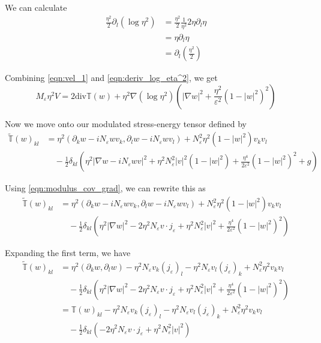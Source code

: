 \documentclass[a4paper]{article}
\renewcommand{\div}{\mathrm{div}}
\begin{document}
We can calculate
\begin{align}
  \frac{\eta^2}{2} \partial_l ( \log \eta^2 ) &= \frac{\eta^2}{2} \frac{1}{\eta^2} 2 \eta \partial_l \eta \nonumber \\
  &= \eta \partial_l \eta \nonumber \\
  &= \partial_l \left( \frac{\eta^2}{2} \right)
  \label{eqn:deriv_log_eta^2}
\end{align}

Combining \eqref{eqn:vel_1} and \eqref{eqn:deriv_log_eta^2}, we get
\begin{equation}
  M_\varepsilon \eta^2 V = 2 \div \mathbb{T}(w) + \eta^2 \nabla ( \log \eta^2 ) \left( | \nabla w |^2 + \frac{\eta^2}{\varepsilon^2} (1-|w|^2)^2
  \right)
  \label{eqn:div_stress_energy}
\end{equation}

Now we move onto our modulated stress-energy tensor defined by
\begin{align}
  \tilde{\mathbb{T}}(w)_{kl} &= \eta^2 ( \partial_k w - i N_\varepsilon w v_k, \partial_l w - i N_\varepsilon w v_l) + N_\varepsilon^2 \eta^2 (1-|w|^2)
  v_k v_l \nonumber \\
  &\quad - \frac{1}{2} \delta_{kl} \left( \eta^2 | \nabla w - i N_\varepsilon w v |^2 + \eta^2 N_\varepsilon^2 |v|^2 (1 - |w|^2) + \frac{\eta^4}{2 \varepsilon^2} (1-|w|^2)^2 + g \right)
  \label{eqn:def_mod_stress_energy}
\end{align}

Using \eqref{eqn:modulus_cov_grad}, we can rewrite this as
\begin{align}
  \tilde{\mathbb{T}}(w)_{kl} &= \eta^2 ( \partial_k w - i N_\varepsilon w v_k, \partial_l w - i N_\varepsilon w v_l) + N_\varepsilon^2 \eta^2 (1-|w|^2)
  v_k v_l \nonumber \\
  &\quad - \frac{1}{2} \delta_{kl} \left( \eta^2 | \nabla w |^2 - 2 \eta^2 N_\varepsilon v \cdot j_\varepsilon + \eta^2 N_\varepsilon^2 |v|^2 + \frac{\eta^4}{2 \varepsilon^2} (1-|w|^2)^2 \right)
  \label{eqn:mod_stress_energy}
\end{align}

Expanding the first term, we have
\begin{align}
  \tilde{\mathbb{T}}(w)_{kl} &= \eta^2 ( \partial_k w , \partial_l w ) - \eta^2 N_\varepsilon v_k (j_\varepsilon)_l - \eta^2 N_\varepsilon v_l
  (j_\varepsilon)_k + N_\varepsilon^2 \eta^2 v_k v_l \nonumber \\
  &\quad -\frac{1}{2} \delta_{kl} \left( \eta^2 | \nabla w |^2 - 2 \eta^2 N_\varepsilon v \cdot j_\varepsilon + \eta^2 N_\varepsilon^2 |v|^2 +
  \frac{\eta^4}{2 \varepsilon^2} (1-|w|^2)^2 \right) \nonumber \\
  &= \mathbb{T}(w)_{kl} - \eta^2 N_\varepsilon v_k (j_\varepsilon)_l - \eta^2 N_\varepsilon v_l (j_\varepsilon)_k + N_\varepsilon^2 \eta^2 v_k v_l
  \nonumber \\
  &\quad - \frac{1}{2} \delta_{kl} \left( - 2\eta^2 N_\varepsilon v \cdot j_\varepsilon + \eta^2 N_\varepsilon^2 |v|^2 \right)
  \label{eqn:stress_energy_expanded}
\end{align}
\end{document}
